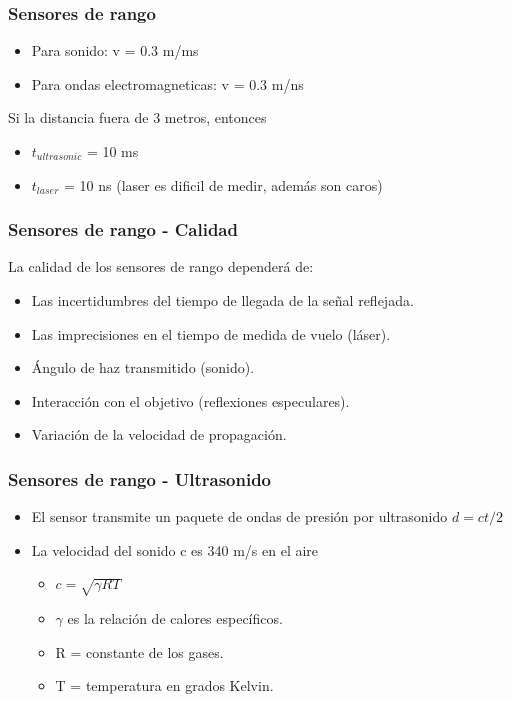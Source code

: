 \documentclass{beamer}
\begin{document}
\begin{frame}
\frametitle{Sensores de rango}
\begin{itemize}
\item Para sonido: v = 0.3 m/ms
\item Para ondas electromagneticas: v = 0.3 m/ns
\end{itemize}

Si la distancia fuera de 3 metros, entonces

\begin{itemize}
\item $t_{ultrasonic}$ = 10 ms
\item $t_{laser}$ = 10 ns (laser es dificil de medir, además son caros)
\end{itemize}
\end{frame}

\begin{frame}
\frametitle{Sensores de rango - Calidad}
La calidad de los sensores de rango dependerá de:\\
\begin{itemize}
\item Las incertidumbres del tiempo de llegada de la señal reflejada.
\item Las imprecisiones en el tiempo de medida de vuelo (láser).
\item Ángulo de haz transmitido (sonido).
\item Interacción con el objetivo (reflexiones especulares).
\item Variación de la velocidad de propagación.
\end{itemize}
\end{frame}

\begin{frame}
\frametitle{Sensores de rango - Ultrasonido}
\begin{itemize}
\item El sensor transmite un paquete de ondas de presión por ultrasonido $d = c t / 2$
\item La velocidad del sonido c es 340 m/s en el aire
\begin{itemize}
\item $c = \sqrt{\gamma RT}$
\item $\gamma$ es la relación de calores específicos.
\item R = constante de los gases.
\item T = temperatura en grados Kelvin.
\end{itemize}
\end{itemize}
\end{frame}
\end{document}
